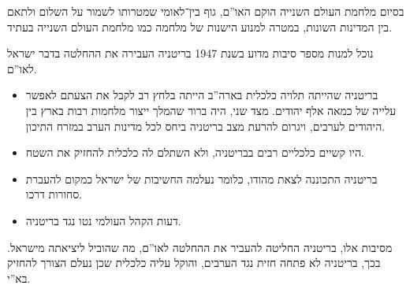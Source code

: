 \documentclass[]{../../../../tex/classes/homework}
\begin{document}
	בסיום מלחמת העולם השנייה הוקם האו''ם, גוף בין־לאומי שמטרותו לשמור על השלום ולתאם בין המדינות השונות, במטרה למנוע הישנות של מלחמה כמו מלחמת העולם השנייה בעתיד. 
	
	נוכל למנות מספר סיבות מדוע בשנת 1947 בריטניה העבירה את ההחלטה בדבר ישראל לאו''ם. 
	
	\begin{itemize}
		\item בריטניה שהייתה תלויה כלכלית בארה''ב הייתה בלחץ רב לקבל את הצעתם לאפשר עלייה של כמאה אלף יהודים. מצד שני, היה ברור שהמלך ייצור מלחמות רבות בארץ בין היהודים לערבים, ויגרום להרעת מצב בריטניה ביחס לכל מדינות הערב במזרח התיכון. 
		\item היו קשיים כלכליים רבים בבריטניה, ולא השתלם לה כלכלית להחזיק את השטח. 
		\item בריטניה התכוננה לצאת מהודו, כלומר נעלמה החשיבות של ישראל כמקום להעברת סחורות דרכו. 
		\item דעות הקהל העולמי נטו נגד בריטניה. 
	\end{itemize}
	מסיבות אלו, בריטניה החליטה להעביר את ההחלטה לאו''ם, מה שהוביל ליציאתה מישראל. בכך, בריטניה לא פתחה חזית נגד הערבים, והוקל עליה כלכלית שכן נעלם הצורך להחזיק בא''י. 
	
	\ndoc
\end{document}
